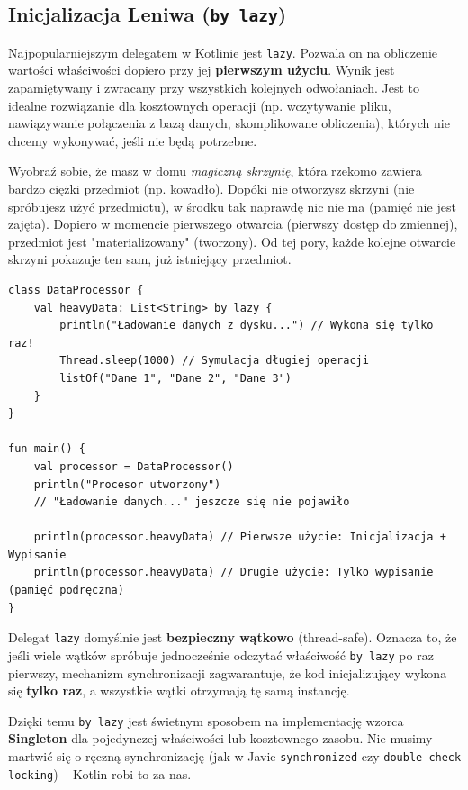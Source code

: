 \subsection{Inicjalizacja Leniwa (\texttt{by lazy})}

Najpopularniejszym delegatem w Kotlinie jest \texttt{lazy}. Pozwala on na obliczenie wartości właściwości dopiero przy jej \textbf{pierwszym użyciu}. Wynik jest zapamiętywany i zwracany przy wszystkich kolejnych odwołaniach. Jest to idealne rozwiązanie dla kosztownych operacji (np. wczytywanie pliku, nawiązywanie połączenia z bazą danych, skomplikowane obliczenia), których nie chcemy wykonywać, jeśli nie będą potrzebne.

Wyobraź sobie, że masz w domu \textit{magiczną skrzynię}, która rzekomo zawiera bardzo ciężki przedmiot (np. kowadło). Dopóki nie otworzysz skrzyni (nie spróbujesz użyć przedmiotu), w środku tak naprawdę nic nie ma (pamięć nie jest zajęta). Dopiero w momencie pierwszego otwarcia (pierwszy dostęp do zmiennej), przedmiot jest "materializowany" (tworzony). Od tej pory, każde kolejne otwarcie skrzyni pokazuje ten sam, już istniejący przedmiot.

\begin{verbatim}
class DataProcessor {
    val heavyData: List<String> by lazy {
        println("Ładowanie danych z dysku...") // Wykona się tylko raz!
        Thread.sleep(1000) // Symulacja długiej operacji
        listOf("Dane 1", "Dane 2", "Dane 3")
    }
}

fun main() {
    val processor = DataProcessor()
    println("Procesor utworzony") 
    // "Ładowanie danych..." jeszcze się nie pojawiło
    
    println(processor.heavyData) // Pierwsze użycie: Inicjalizacja + Wypisanie
    println(processor.heavyData) // Drugie użycie: Tylko wypisanie (pamięć podręczna)
}
\end{verbatim}

Delegat \texttt{lazy} domyślnie jest \textbf{bezpieczny wątkowo} (thread-safe). Oznacza to, że jeśli wiele wątków spróbuje jednocześnie odczytać właściwość \texttt{by lazy} po raz pierwszy, mechanizm synchronizacji zagwarantuje, że kod inicjalizujący wykona się \textbf{tylko raz}, a wszystkie wątki otrzymają tę samą instancję.

Dzięki temu \texttt{by lazy} jest świetnym sposobem na implementację wzorca \textbf{Singleton} dla pojedynczej właściwości lub kosztownego zasobu. Nie musimy martwić się o ręczną synchronizację (jak w Javie \texttt{synchronized} czy \texttt{double-check locking}) – Kotlin robi to za nas.


